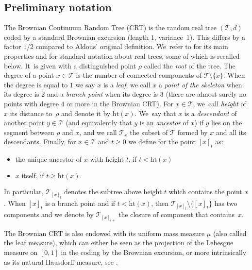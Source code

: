 \documentclass[11pt]{article}
\newcommand{\T}{\mathcal{T}}\let\CRT\T\let\tbr\T
\newcommand{\h}{\mathrm{ht}}
\theoremstyle{definition}
\begin{document}
\subsection{Preliminary notation}

The Brownian Continuum Random Tree (CRT) is the random real tree $(\mathcal{T}, d)$ coded by a standard Brownian excursion (length $1$, variance~$1$). This differs by a factor $1/2$ compared to Aldous' original definition. We~refer to \cite{LG2005} for its main properties and for standard notation about real trees, some of which is recalled below. It~is given with a distinguished point $ \rho$ called the \emph{root} of the tree. The degree of a point $x \in \mathcal{T}$ is the number of connected components of $\T\setminus \{x\}$. When the degree is equal to $1$ we say $x$ is a \emph{leaf}; we call $x$ a \emph{point of the skeleton} when its degree is $2$ and a \emph{branch point} when its degree is $3$ (there are almost surely no points with degree $4$ or more in the Brownian CRT). For $x\in \T$, we~call \emph{height} of $x$ its distance to~$\rho$ and denote it by $\h(x)$. We~say that $x$ is a \emph{descendant} of another point $y\in\T$ (and equivalently that $y$ is an \emph{ancestor} of $x$) if $y$ lies on the segment between $\rho$ and $x$, and we call $\T_x$ the subset of $\T$ formed by $x$ and all its descendants. Finally, for $x \in \T$ and $t\geq 0$ we define for the point $[x]_t$ as:
\begin{itemize}
\item the unique ancestor of $x$ with height $t$, if $t< \h(x)$
\item $x$ itself, if $t\geq \h(x)$.
\end{itemize}
In particular, $ \T_{[x]_t}$ denotes the subtree above height $t$ which contains the point $x$. When $[x]_t$ is a branch point and if $t < \h(x)$, then $\T_{[x]_t} \setminus \{[x]_t\}$ has two components and we denote by $ \mathcal{T}_{[x]_{t+}}$ the closure of component that contains~$x$.

The Brownian CRT is also endowed with its uniform mass measure $\mu$ (also called the leaf measure), which can either be seen as the projection of the Lebesgue measure on $[0,1]$ in the coding by the Brownian excursion, or more intrinsically as its natural Hausdorff measure, see \cite{duquesne2005probabilistic,duquesne2006hausdorff}.
\end{document}

